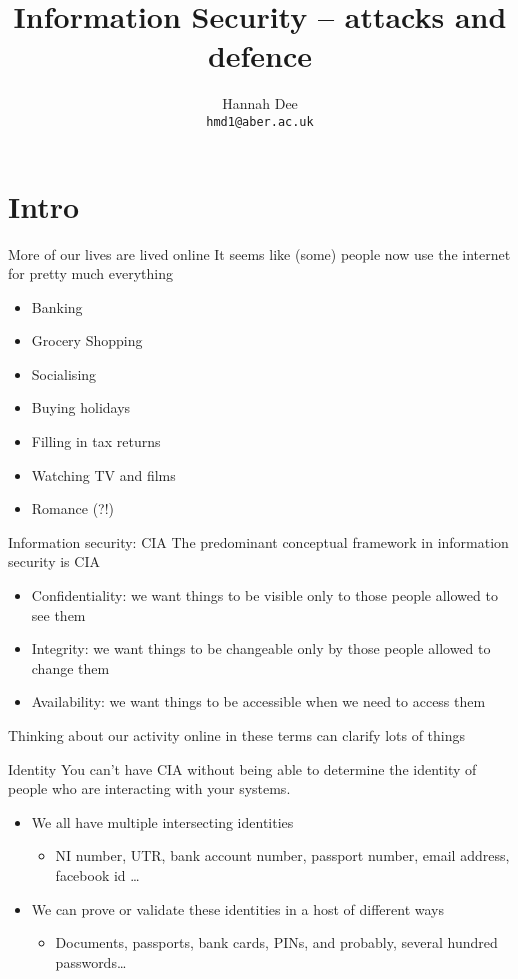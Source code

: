 \documentclass[xcolor=table]{beamer}
\title{Information Security -- attacks and defence}
\author[hmd1]{Hannah Dee \\
  \texttt{hmd1@aber.ac.uk}}
\date{}
\institute[]{U3A Aberystwyth, April 2023\\
  Aberystwyth University, Department of Computer Science}
\begin{document}
\begin{frame}
  \titlepage
\end{frame}


\section{Intro}

\begin{frame}{More of our lives are lived online}
	It seems like (some) people now use the internet for pretty much everything
	\begin{itemize}
		\item Banking
		\item Grocery Shopping
		\item Socialising 
		\item Buying holidays
		\item Filling in tax returns
		\item Watching TV and films 
		\item Romance (?!) 
	\end{itemize}
\end{frame}
\begin{frame}{Information security: CIA}
	The predominant conceptual framework in information security is CIA
	\begin{itemize}
		\item Confidentiality: we want things to be visible only to those people allowed to see them
		\item Integrity: we want things to be changeable only by those people allowed to change them 
		\item Availability: we want things to be accessible when we need to access them
	\end{itemize}
	Thinking about our activity online in these terms can clarify lots of things
\end{frame}
\begin{frame}{Identity}
	You can't have CIA without being able to determine the identity of people who are interacting with your systems.
	\begin{itemize}
		\item We all have multiple intersecting identities
			\begin{itemize}
				\item NI number, UTR, bank account number, passport number, email address, facebook id \ldots
			\end{itemize}
		\item We can prove or validate these identities in a host of different ways
			\begin{itemize}
				\item Documents, passports, bank cards, PINs, and probably, several hundred passwords\ldots
			\end{itemize}
	\end{itemize}

\end{frame}
\end{document}
